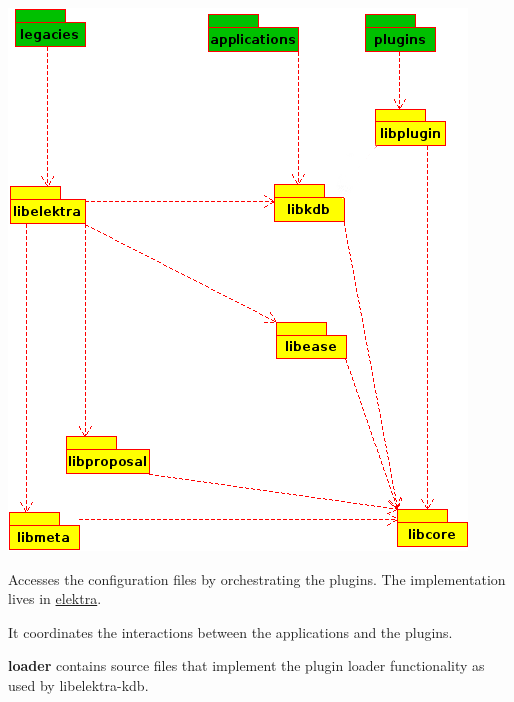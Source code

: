 \begin{DoxyImage}
\includegraphics[width=\textwidth,height=\textheight/2,keepaspectratio=true]{overview_libs.png}
\end{DoxyImage}



\begin{DoxyCode}{0}
\end{DoxyCode}


Accesses the configuration files by orchestrating the plugins. The implementation lives in \mbox{\hyperlink{md_src_libs_elektra_README_src_libs_elektra_README_md}{elektra}}.

It coordinates the interactions between the applications and the plugins.

{\bfseries{loader}} contains source files that implement the plugin loader functionality as used by {\ttfamily libelektra-\/kdb}.


\begin{DoxyCode}{0}
\end{DoxyCode}


